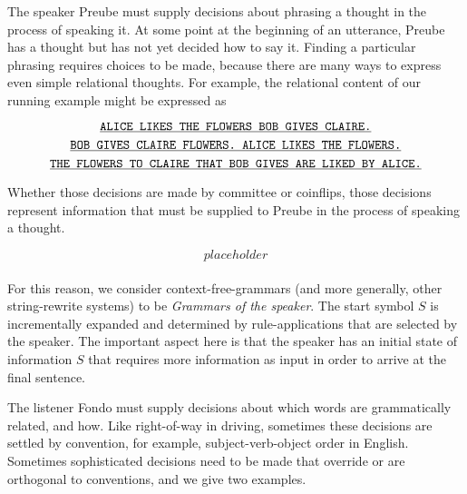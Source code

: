  The speaker Preube must supply decisions about phrasing a thought in the process of speaking it. At some point at the beginning of an utterance, Preube has a thought but has not yet decided how to say it. Finding a particular phrasing requires choices to be made, because there are many ways to express even simple relational thoughts. For example, the relational content of our running example might be expressed as 

\[\texttt{\underline{ALICE LIKES THE FLOWERS BOB GIVES CLAIRE.}}\]
\[\texttt{\underline{BOB GIVES CLAIRE FLOWERS. ALICE LIKES THE FLOWERS.}}\]
\[\texttt{\underline{THE FLOWERS TO CLAIRE THAT BOB GIVES ARE LIKED BY ALICE.}}\]

Whether those decisions are made by committee or coinflips, those decisions represent information that must be supplied to Preube in the process of speaking a thought.

\[placeholder\]\\

For this reason, we consider context-free-grammars (and more generally, other string-rewrite systems) to be \emph{Grammars of the speaker}. The start symbol $S$ is incrementally expanded and determined by rule-applications that are selected by the speaker. The important aspect here is that the speaker has an initial state of information $S$ that requires more information as input in order to arrive at the final sentence.

 The listener Fondo must supply decisions about which words are grammatically related, and how. Like right-of-way in driving, sometimes these decisions are settled by convention, for example, subject-verb-object order in English. Sometimes sophisticated decisions need to be made that override or are orthogonal to conventions, and we give two examples.

